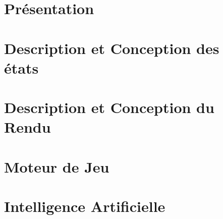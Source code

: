 \documentclass[12pt, 			%
               singlespacing,         %
			  ]{report}
\begin{document}






\tableofcontents

\listoffigures










\chapter[Présentation]{Présentation}


\chapter[Description et Conception des états]{Description et Conception des états}


\chapter[Description et Conception du Rendu]{Description et Conception du Rendu}


\chapter[Moteur de Jeu]{Moteur de Jeu}


\chapter[Intelligence Artificielle]{Intelligence Artificielle}


\end{document}
